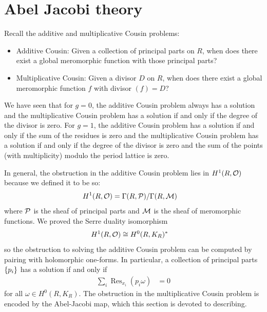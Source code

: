 \documentclass[12pt]{article}
\begin{document}
\section{Abel Jacobi theory}
Recall the additive and multiplicative Cousin problems: 
\begin{itemize}
    \item Additive Cousin: Given a collection of principal parts on $R$, when does there exist a global meromorphic function with those principal parts?
    \item Multiplicative Cousin: Given a divisor $D$ on $R$, when does there exist a global meromorphic function $f$ with divisor $(f) = D$?
\end{itemize}
We have seen that for $g=0$, the additive Cousin problem always has a solution and the multiplicative Cousin problem has a solution if and only if the degree of the divisor is zero. For $g = 1$, the additive Cousin problem has a solution if and only if the sum of the residues is zero and the multiplicative Cousin problem has a solution if and only if the degree of the divisor is zero and the sum of the points (with multiplicity) modulo the period lattice is zero.

In general, the obstruction in the additive Cousin problem lies in $H^1(R, {\mathcal{O}})$ because we defined it to be so:
\begin{align*}
    H^1(R, {\mathcal{O}}) & = \Gamma(R, {\mathcal{P}}) / \Gamma(R, {\mathcal{M}})
\end{align*} where ${\mathcal{P}}$ is the sheaf of principal parts and ${\mathcal{M}}$ is the sheaf of meromorphic functions. We proved the Serre duality isomorphism \begin{align*}
    H^1(R, {\mathcal{O}}) & \cong H^0(R, K_R)^*
\end{align*} so the obstruction to solving the additive Cousin problem can be computed by pairing with holomorphic one-forms. In particular, a collection of principal parts $\{p_i\}$ has a solution if and only if \begin{align*}
    \sum_i \operatorname{Res}_{x_i}(p_i \omega) & = 0
\end{align*} for all $\omega \in H^0(R, K_R)$.
The obstruction in the multiplicative Cousin problem is encoded by the Abel-Jacobi map, which this section is devoted to describing.
\end{document}
